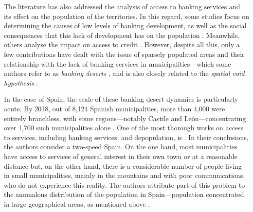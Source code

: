 \documentclass[a4paper,11pt,oneside]{article}
\begin{document}

The literature has also addressed the analysis of access to banking services and its effect on the population of the territories. In this regard, some studies focus on determining the causes of low levels of banking development, as well as the social consequences that this lack of development has on the population \citep[see][among others]{kubrin2011does,hegerty2016commercial,eisenberg2018payday,kashian2018bank,hegerty2019comparison,hasan2019economic,hegerty2020banking,mishura2020providing,hegerty2021bank}. Meanwhile, others analyse the impact on access to credit \citep[see, for instance,][]{petersen2002does,degryse2005distance,amel2005perceived,ergungor2010bank,brevoort2006commercial,Brevoort2009,adams2023lending,brevoort2010distance,agarwal2010distance,gilje2016exporting,nguyen2019credit}. However, despite all this, only a few contributions have dealt with the issue of sparsely populated areas and their relationship with the lack of banking services in municipalities---which some authors refer to as \textit{banking deserts} \citep{hegerty2020banking}, and is also closely related to the \textit{spatial void hypothesis} \citep{smith2008alternative}.





In the case of Spain, the scale of these banking desert dynamics is particularly acute. By 2018, out of 8,124 Spanish municipalities, more than 4,000 were entirely branchless, with some regions---notably Castile and León---concentrating over 1,700 such municipalities alone \citep{camacho2021financial}. One of the most thorough works on access to services, including banking services, and depopulation, is \cite{goerlich2021distribucion}. In their conclusions, the authors consider a two-speed Spain. On the one hand, most municipalities have access to services of general interest in their own town or at a reasonable distance but, on the other hand, there is a considerable number of people living in small municipalities, mainly in the mountains and with poor communications, who do not experience this reality. The authors attribute part of this problem to the anomalous distribution of the population in Spain---population concentrated in large geographical areas, as mentioned above \citep{gutierrez2023spatial}.
\end{document}
